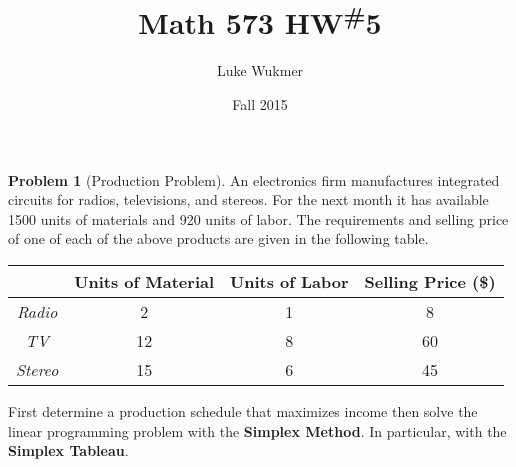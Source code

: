 \documentclass[11pt]{article}
\theoremstyle{plain}
\theoremstyle{definition}
\newtheorem{prob}{Problem}
\numberwithin{equation}{section}
\begin{document}
\title{Math 573 HW\textsuperscript{\#}5}
\author{Luke Wukmer}
\date{Fall 2015}
\maketitle \thispagestyle{empty} %
\lstset{language=Python}

\begin{prob}[Production Problem]

An electronics firm manufactures integrated circuits for radios,
televisions, and stereos. For the next month it has available 1500 units of materials and 920
units of labor. The requirements and selling price of one of each of the above products are
given in the following table.

\begin{center}
\begin{tabu}{>{\itshape}c|ccc}
    \hline
    \rowfont{\itshape} &  Units of Material & Units of Labor & Selling Price (\$) \\
    \hline 
    Radio  & 2    & 1   & 8 \\
    TV     & 12   & 8   & 60 \\
    Stereo & 15   & 6   & 45 
\end{tabu}
\end{center}

First determine a production schedule that maximizes income then solve
the linear programming problem with the \textbf{Simplex Method}.
In particular, with the \textbf{Simplex Tableau}.
\end{prob}
\dotfill %
\end{document}
